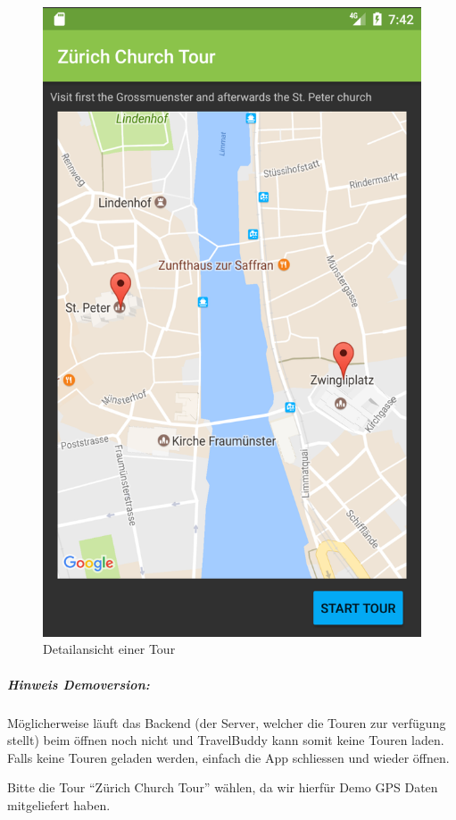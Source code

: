 \documentclass[a4paper,10pt,xetex]{article}
\begin{document}
\begin{figure}
\begin{minipage}[b]{0.48\textwidth}
    \includegraphics[width=\textwidth]{screenshots/DetailActivity}
    \caption{Detailansicht einer Tour}
    \label{fig:detail-activity}
  \end{minipage}
\end{figure}

\subparagraph{Hinweis Demoversion:}
Möglicherweise läuft das Backend (der Server, welcher die Touren zur verfügung stellt) beim
öffnen noch nicht und TravelBuddy kann somit keine Touren laden. Falls keine Touren geladen
werden, einfach die App schliessen und wieder öffnen.

Bitte die Tour ``Zürich Church Tour'' wählen, da wir hierfür Demo GPS Daten mitgeliefert haben.
\end{document}
